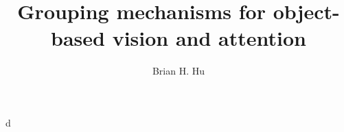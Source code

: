 \documentclass[12pt,oneside,final]{thesis}
\begin{document}
\title{Grouping mechanisms for object-based vision and attention}
\author{Brian H. Hu}
\dissertation
\doctorphilosophy
\copyrightnotice









\begin{appendices}
d
\end{appendices}


\cleardoublepage %
{}




\end{document}
